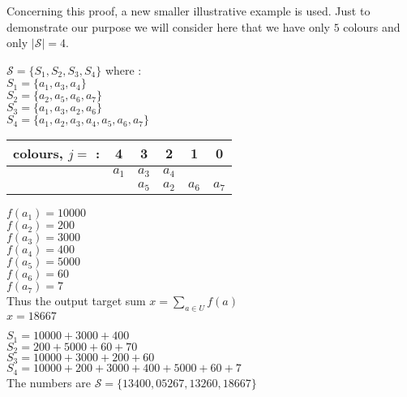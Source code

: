 \begin{example}
Concerning this proof, a new smaller illustrative example is used. Just to demonstrate our purpose we will consider here that we have only
$5$ colours and only $|\mathcal{S}| = 4$.  \\
\begin{flushleft}
  $\mathcal{S} = \{S_1, S_2, S_3, S_4\}$ where : \\
  $S_1 = \{a_1, a_3, a_4\} $ \\
  $S_2 = \{a_2, a_5,a_6, a_7\} $ \\
  $S_3 = \{a_1, a_3, a_2, a_6\} $ \\
  $S_4 = \{a_1, a_2, a_3, a_4, a_5, a_6, a_7\} $ \\
\end{flushleft}

\begin{flushleft}
  \begin{tabular}{ |c|c|c|c||c|c| }
    \hline
    colours, $j =$ : & 4 & 3 & 2 & 1 & 0 \\
    \hline
    & $a_1$ & $a_3$ & $a_4$ & &          \\
    &  & $a_5$ & $a_2$ & $a_6$ & $a_7$  \\
    \hline
  \end{tabular}
\end{flushleft}

\begin{flushleft}
  $f(a_1) = 10000$ \\
  $f(a_2) = 200$   \\
  $f(a_3) = 3000$  \\
  $f(a_4) = 400$   \\
  $f(a_5) = 5000$  \\
  $f(a_6) = 60$    \\
  $f(a_7) = 7$     \\
  Thus the output target sum $x = \sum_{a \in U} f(a)$ \\
  \qquad \qquad \qquad \qquad \qquad \qquad \quad $x = 18667$
\end{flushleft}

\begin{flushleft}
  $S_1 = 10000 + 3000 + 400$ \\
  $S_2 = 200 + 5000 + 60 + 70$   \\
  $S_3 = 10000 + 3000 + 200 + 60$  \\
  $S_4 = 10000 + 200 + 3000 + 400 + 5000 + 60 + 7$   \\
  The numbers are $ \mathcal {S} = \{13400, 05267, 13260, 18667\} $ \\
\end{flushleft}


\end{example}
